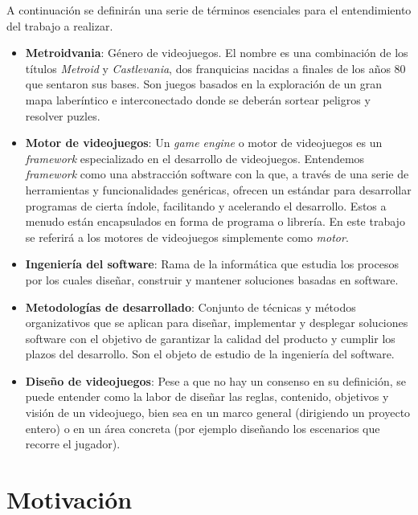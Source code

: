 A continuación se definirán una serie de términos esenciales para el entendimiento del trabajo a realizar.

\begin{itemize}
    \item \textbf{Metroidvania}: Género de videojuegos. El nombre es una combinación de los títulos \textit{Metroid} y \textit{Castlevania}, dos franquicias nacidas a finales de los años 80 que sentaron sus bases. Son juegos basados en la exploración de un gran mapa laberíntico e interconectado donde se deberán sortear peligros y resolver puzles.

    \item \textbf{Motor de videojuegos}: Un \textit{game engine} o motor de videojuegos es un \textit{framework} especializado en el desarrollo de videojuegos. Entendemos \textit{framework} como una abstracción software con la que, a través de una serie de herramientas y funcionalidades genéricas, ofrecen un estándar para desarrollar programas de cierta índole, facilitando y acelerando el desarrollo. Estos a menudo están encapsulados en forma de programa o librería. En este trabajo se referirá a los motores de videojuegos simplemente como \textit{motor}.
    
    \item \textbf{Ingeniería del software}: Rama de la informática que estudia los procesos por los cuales diseñar, construir y mantener soluciones basadas en software.

    \item \textbf{Metodologías de desarrollado}: Conjunto de técnicas y métodos organizativos que se aplican para diseñar, implementar y desplegar soluciones software con el objetivo de garantizar la calidad del producto y cumplir los plazos del desarrollo. Son el objeto de estudio de la ingeniería del software.
    
    \item \textbf{Diseño de videojuegos}: Pese a que no hay un consenso en su definición, se puede entender como la labor de diseñar las reglas, contenido, objetivos y visión de un videojuego, bien sea en un marco general (dirigiendo un proyecto entero) o en un área concreta (por ejemplo diseñando los escenarios que recorre el jugador).

\end{itemize} 

\section{Motivación}

